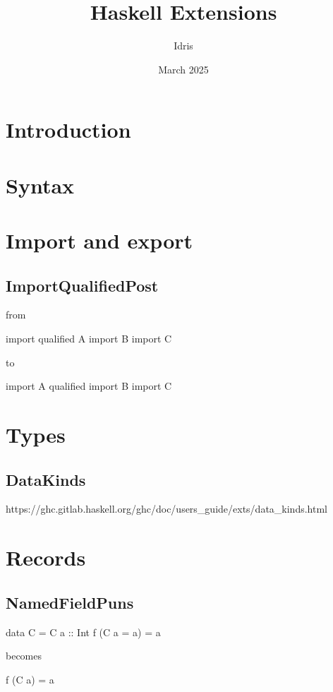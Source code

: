 \documentclass[openany, 11pt]{book}
\title{Haskell Extensions}
\author{Idris}
\date{March 2025}
\begin{document}
\tableofcontents

\part{Introduction}
\part{Syntax}
\part{Import and export}

\chapter{ImportQualifiedPost}
from
\begin{haskell}{}
import qualified A
import           B
import           C
\end{haskell}

to
\begin{haskell}{}
import A qualified
import B
import C
\end{haskell}


\part{Types}

\chapter{DataKinds}
https://ghc.gitlab.haskell.org/ghc/doc/users_guide/exts/data_kinds.html

\part{Records}

\chapter{NamedFieldPuns}
\begin{haskell}{}
data C = C {a :: Int}
f (C {a = a}) = a
\end{haskell}
becomes

\begin{haskell}{}
f (C {a}) = a
\end{haskell}
\end{document}
